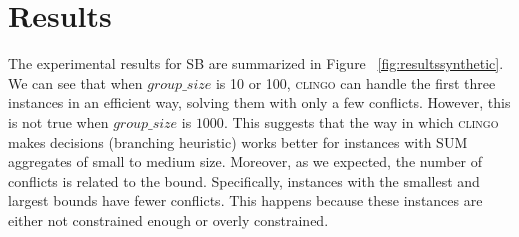 \section{Results}

The experimental results for SB are summarized in Figure ~\ref{fig:resultssynthetic}. 
We can see that when $\mathit{group\_size}$ is 10 or 100, \textsc{clingo} can handle 
the first three instances in an efficient way, solving them with only a few conflicts. 
However, this is not true when $\mathit{group\_size}$ is $1000$. This suggests that the way 
in which \textsc{clingo} makes decisions (branching heuristic) works better for instances with 
SUM aggregates of small to medium size.
Moreover, as we expected, the number of conflicts is related to the bound. Specifically, 
instances with the smallest and largest bounds have fewer conflicts. 
This happens because these instances are either not constrained enough or overly constrained.


